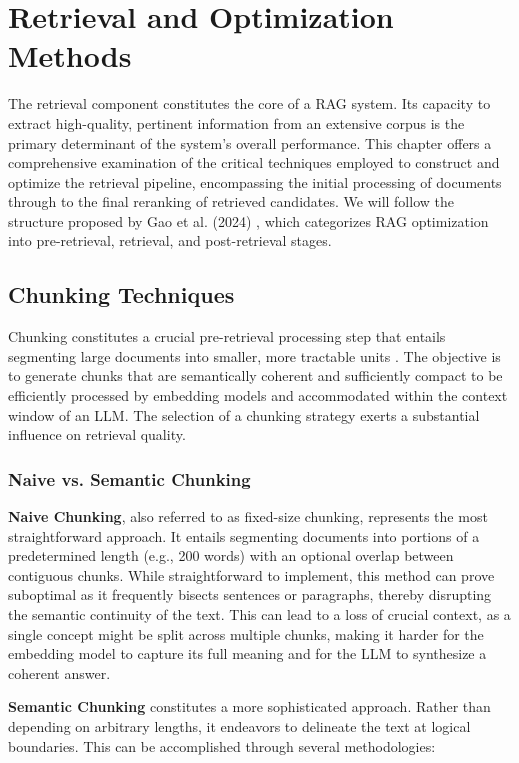 \chapter{Retrieval and Optimization Methods}
\label{chap:retrieval_optimization}

The retrieval component constitutes the core of a RAG system. Its capacity to extract high-quality, pertinent information from an extensive corpus is the primary determinant of the system's overall performance. This chapter offers a comprehensive examination of the critical techniques employed to construct and optimize the retrieval pipeline, encompassing the initial processing of documents through to the final reranking of retrieved candidates. We will follow the structure proposed by Gao et al. (2024) \autocite{gao2024retrievalaugmented}, which categorizes RAG optimization into pre-retrieval, retrieval, and post-retrieval stages.

\section{Chunking Techniques}
Chunking constitutes a crucial pre-retrieval processing step that entails segmenting large documents into smaller, more tractable units \autocite{zhang2023impact}. The objective is to generate chunks that are semantically coherent and sufficiently compact to be efficiently processed by embedding models and accommodated within the context window of an LLM. The selection of a chunking strategy exerts a substantial influence on retrieval quality.

\subsection{Naive vs. Semantic Chunking}
\textbf{Naive Chunking}, also referred to as fixed-size chunking, represents the most straightforward approach. It entails segmenting documents into portions of a predetermined length (e.g., 200 words) with an optional overlap between contiguous chunks. While straightforward to implement, this method can prove suboptimal as it frequently bisects sentences or paragraphs, thereby disrupting the semantic continuity of the text. This can lead to a loss of crucial context, as a single concept might be split across multiple chunks, making it harder for the embedding model to capture its full meaning and for the LLM to synthesize a coherent answer.

\textbf{Semantic Chunking} constitutes a more sophisticated approach. Rather than depending on arbitrary lengths, it endeavors to delineate the text at logical boundaries. This can be accomplished through several methodologies:

